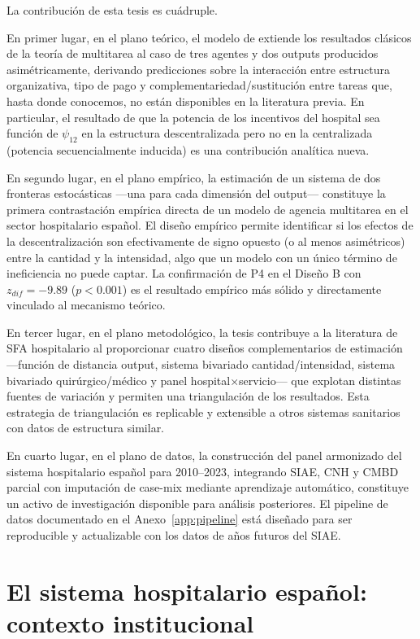 \documentclass[12pt, a4paper, twoside, openright]{book}
\theoremstyle{plain}
\theoremstyle{definition}
\theoremstyle{remark}
\begin{document}
La contribución de esta tesis es cuádruple.

En primer lugar, en el plano teórico, el modelo de \citet{izquierdo2019} extiende los resultados clásicos de la teoría de multitarea \citep{holmstrom1991} al caso de tres agentes y dos outputs producidos asimétricamente, derivando predicciones sobre la interacción entre estructura organizativa, tipo de pago y complementariedad/sustitución entre tareas que, hasta donde conocemos, no están disponibles en la literatura previa. En particular, el resultado de que la potencia de los incentivos del hospital sea función de $\psi_{12}$ en la estructura descentralizada pero no en la centralizada (potencia secuencialmente inducida) es una contribución analítica nueva.

En segundo lugar, en el plano empírico, la estimación de un sistema de dos fronteras estocásticas ---una para cada dimensión del output--- constituye la primera contrastación empírica directa de un modelo de agencia multitarea en el sector hospitalario español. El diseño empírico permite identificar si los efectos de la descentralización son efectivamente de signo opuesto (o al menos asimétricos) entre la cantidad y la intensidad, algo que un modelo con un único término de ineficiencia no puede captar. La confirmación de P4 en el Diseño B con $z_{dif}=-9.89$ ($p<0.001$) es el resultado empírico más sólido y directamente vinculado al mecanismo teórico.

En tercer lugar, en el plano metodológico, la tesis contribuye a la literatura de SFA hospitalario al proporcionar cuatro diseños complementarios de estimación ---función de distancia output, sistema bivariado cantidad/intensidad, sistema bivariado quirúrgico/médico y panel hospital$\times$servicio--- que explotan distintas fuentes de variación y permiten una triangulación de los resultados. Esta estrategia de triangulación es replicable y extensible a otros sistemas sanitarios con datos de estructura similar.

En cuarto lugar, en el plano de datos, la construcción del panel armonizado del sistema hospitalario español para 2010--2023, integrando SIAE, CNH y CMBD parcial con imputación de case-mix mediante aprendizaje automático, constituye un activo de investigación disponible para análisis posteriores. El pipeline de datos documentado en el Anexo~\ref{app:pipeline} está diseñado para ser reproducible y actualizable con los datos de años futuros del SIAE.

\section{El sistema hospitalario español: contexto institucional}
\label{sec:contexto_sns}
\end{document}
